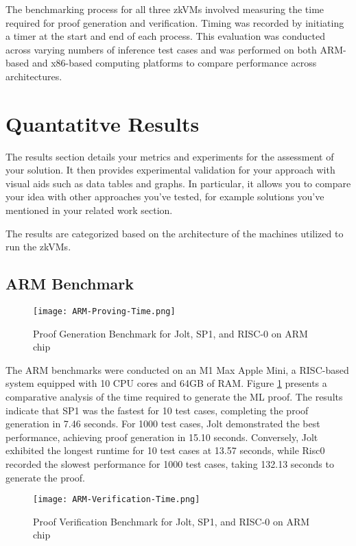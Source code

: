 \documentclass{scrartcl}
\begin{document}
The benchmarking process for all three zkVMs involved measuring the time required for proof generation and verification. Timing was recorded by initiating a timer at the start and end of each process. This evaluation was conducted across varying numbers of inference test cases and was performed on both ARM-based and x86-based computing platforms to compare performance across architectures.

\section{Quantatitve Results}

The results section details your metrics and experiments for the assessment of your solution. It then provides experimental validation for your approach with visual aids such as data tables and graphs. In particular, it allows you to compare your idea with other approaches you've tested, for example solutions you've mentioned in your related work section.

The results are categorized based on the architecture of the machines utilized to run the zkVMs.

\subsection{ARM Benchmark}

\begin{figure}
	\begin{center}
		\texttt{[image: ARM-Proving-Time.png]}
	\end{center}
	\caption{Proof Generation Benchmark for Jolt, SP1, and RISC-0 on ARM chip}
	\label{graph:arm-proving-time}
\end{figure}

The ARM benchmarks were conducted on an M1 Max Apple Mini, a RISC-based system equipped with 10 CPU cores and 64GB of RAM. Figure \ref{graph:arm-proving-time} presents a comparative analysis of the time required to generate the ML proof. The results indicate that SP1 was the fastest for 10 test cases, completing the proof generation in 7.46 seconds. For 1000 test cases, Jolt demonstrated the best performance, achieving proof generation in 15.10 seconds. Conversely, Jolt exhibited the longest runtime for 10 test cases at 13.57 seconds, while Risc0 recorded the slowest performance for 1000 test cases, taking 132.13 seconds to generate the proof.

\begin{figure}
	\begin{center}
		\texttt{[image: ARM-Verification-Time.png]}
	\end{center}
	\caption{Proof Verification Benchmark for Jolt, SP1, and RISC-0 on ARM chip}
	\label{graph:arm-verification-time}
\end{figure}
\end{document}
